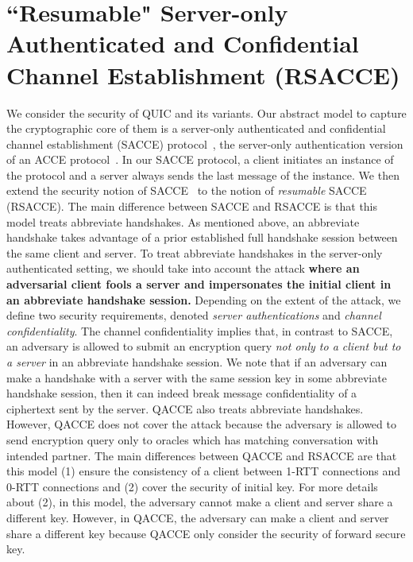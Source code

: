 \section{``Resumable" Server-only Authenticated and Confidential Channel Establishment (RSACCE)} \label{sec:rsacce}
We consider the security of QUIC and its variants.
Our abstract model to capture the cryptographic core
of them is a server-only authenticated and confidential
channel establishment (SACCE) protocol~\cite{KPW13:SACCE},
the server-only authentication version of an ACCE
protocol~\cite{JKSS12:ACCE}.
In our SACCE protocol, a client initiates an instance
of the protocol and a server always sends the last
message of the instance.
We then extend the security notion of
SACCE~\cite{KPW13:SACCE} to the notion of
\textit{resumable} SACCE (RSACCE).
The main difference between SACCE and RSACCE is that this model treats
abbreviate handshakes.
As mentioned above, an abbreviate handshake takes
advantage of a prior established full handshake session
between the same client and server.
To treat abbreviate handshakes in the server-only
authenticated setting, we should take into account the
attack
\textbf{where an adversarial client fools a
server and impersonates the initial client in an
abbreviate handshake session.}
Depending on the extent of the attack, we define two
security requirements, denoted
\textit{server authentications} and
\textit{channel confidentiality}.
The channel confidentiality implies that, in contrast
to SACCE, an adversary is allowed to submit an
encryption query
\textit{not only to a client but to a server} in an
abbreviate handshake session.
We note that if an adversary can make a handshake with
a server with the same session key in some abbreviate
handshake session, then it can indeed break message
confidentiality of a ciphertext sent by the server.
QACCE also treats abbreviate handshakes.
However, QACCE does not cover the attack because the
adversary is allowed to send encryption query only to
oracles which has matching conversation with intended
partner.
The main differences between QACCE and RSACCE are that
this model (1) ensure the consistency of a client between
1-RTT connections and 0-RTT connections and (2) cover the
security of initial key.
For more details about (2), in this model, the adversary
cannot make a client and server share a different key.
However, in QACCE, the adversary can make a client and
server share a different key because QACCE only consider
the security of forward secure key.

